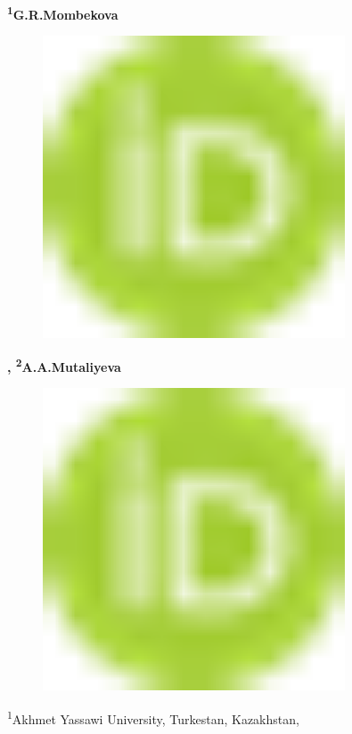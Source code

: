{\bfseries \textsuperscript{1}G.R.Mombekova}
\begin{figure}[H]
	\centering
	\includegraphics[width=0.8\textwidth]{media/ekon/image1}
	\caption*{}
\end{figure}
{\bfseries ,
\textsuperscript{2}A.A.Mutaliyeva}
\begin{figure}[H]
	\centering
	\includegraphics[width=0.8\textwidth]{media/ekon/image1}
	\caption*{}
\end{figure}


\textsuperscript{1}Akhmet Yassawi University, Turkestan, Kazakhstan,

